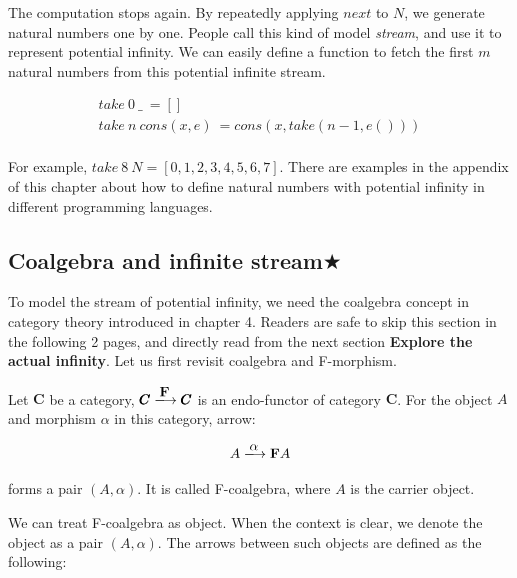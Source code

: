 \documentclass{article}
\begin{document}
The computation stops again. By repeatedly applying $next$ to $N$, we generate natural numbers one by one. People call this kind of model {\em stream}, and use it to represent potential infinity. We can easily define a function to fetch the first $m$ natural numbers from this potential infinite stream.

\[
\begin{array}{l}
take\ 0\ \_\ = [] \\
take\ n\ cons(x, e)\ = cons(x, take(n-1, e())) \\
\end{array}
\]

For example, $take\ 8\ N = [0, 1, 2, 3, 4, 5, 6, 7]$. There are examples in the appendix of this chapter about how to define natural numbers with potential infinity in different programming languages.

\begin{Exercise}
\end{Exercise}

\subsection{Coalgebra and infinite stream$\bigstar$}

To model the stream of potential infinity, we need the coalgebra concept in category theory introduced in chapter 4. Readers are safe to skip this section in the following 2 pages, and directly read from the next section \textbf{Explore the actual infinity}. Let us first revisit coalgebra and F-morphism.

\begin{definition}
\normalfont
Let $\pmb{C}$ be a category, $\pmb{C} \arrowto{\mathbf{F}} \pmb{C}$ is an endo-functor of category $\pmb{C}$. For the object $A$ and morphism $\alpha$ in this category, arrow:

\[
  A \arrowto{\alpha} \mathbf{F} A
\]

forms a pair $(A, \alpha)$. It is called F-coalgebra, where $A$ is the carrier object.
\end{definition}

We can treat F-coalgebra as object. When the context is clear, we denote the object as a pair $(A, \alpha)$. The arrows between such objects are defined as the following:
\end{document}
